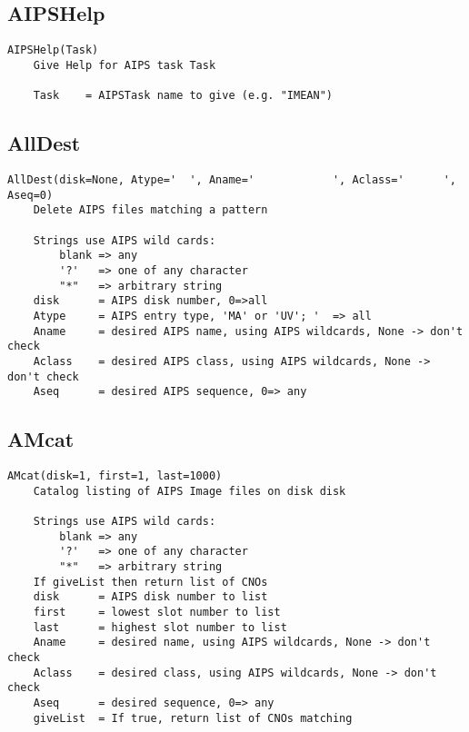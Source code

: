 \documentclass[11pt]{report}
\begin{document}
\subsection{AIPSHelp}
\begin{verbatim}
AIPSHelp(Task)
    Give Help for AIPS task Task
    
    Task    = AIPSTask name to give (e.g. "IMEAN")
\end{verbatim}

\subsection{AllDest}
\begin{verbatim}
AllDest(disk=None, Atype='  ', Aname='            ', Aclass='      ', Aseq=0)
    Delete AIPS files matching a pattern
    
    Strings use AIPS wild cards:
        blank => any
        '?'   => one of any character
        "*"   => arbitrary string
    disk      = AIPS disk number, 0=>all
    Atype     = AIPS entry type, 'MA' or 'UV'; '  => all
    Aname     = desired AIPS name, using AIPS wildcards, None -> don't check
    Aclass    = desired AIPS class, using AIPS wildcards, None -> don't check
    Aseq      = desired AIPS sequence, 0=> any
\end{verbatim}

\subsection{AMcat}
\begin{verbatim}
AMcat(disk=1, first=1, last=1000)
    Catalog listing of AIPS Image files on disk disk
    
    Strings use AIPS wild cards:
        blank => any
        '?'   => one of any character
        "*"   => arbitrary string
    If giveList then return list of CNOs
    disk      = AIPS disk number to list
    first     = lowest slot number to list
    last      = highest slot number to list
    Aname     = desired name, using AIPS wildcards, None -> don't check
    Aclass    = desired class, using AIPS wildcards, None -> don't check
    Aseq      = desired sequence, 0=> any
    giveList  = If true, return list of CNOs matching
\end{verbatim}
\end{document}
